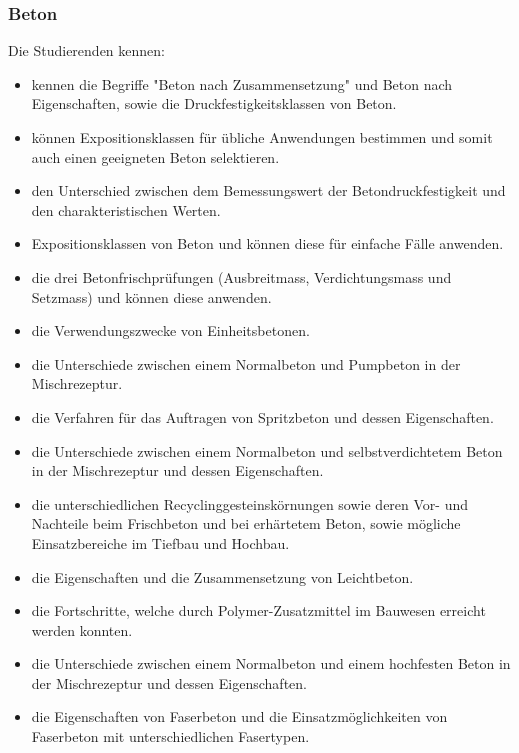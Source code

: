 \subsubsection*{Beton}
Die Studierenden kennen: 

\begin{itemize}[noitemsep]
    \item kennen die Begriffe "Beton nach Zusammensetzung" und Beton nach Eigenschaften, sowie die Druckfestigkeitsklassen von Beton.
    \item können Expositionsklassen für übliche Anwendungen bestimmen und somit auch einen geeigneten Beton selektieren.
  \item den Unterschied zwischen dem Bemessungswert der Betondruckfestigkeit und den charakteristischen Werten.
  \item Expositionsklassen von Beton und können diese für einfache Fälle anwenden.
  \item die drei Betonfrischprüfungen (Ausbreitmass, Verdichtungsmass und Setzmass) und können diese anwenden.
  \item die Verwendungszwecke von Einheitsbetonen.
  \item die Unterschiede zwischen einem Normalbeton und Pumpbeton in der Mischrezeptur.
  \item die Verfahren für das Auftragen von Spritzbeton und dessen Eigenschaften.
  \item die Unterschiede zwischen einem Normalbeton und selbstverdichtetem Beton in der Mischrezeptur und dessen Eigenschaften.
  \item die unterschiedlichen Recyclinggesteinskörnungen sowie deren Vor- und Nachteile beim Frischbeton und bei erhärtetem Beton, sowie mögliche Einsatzbereiche im Tiefbau und Hochbau.
  \item die Eigenschaften und die Zusammensetzung von Leichtbeton.
  \item die Fortschritte, welche durch Polymer-Zusatzmittel im Bauwesen erreicht werden konnten.
  \item die Unterschiede zwischen einem Normalbeton und einem hochfesten Beton in der Mischrezeptur und dessen Eigenschaften.
  \item die Eigenschaften von Faserbeton und die Einsatzmöglichkeiten von Faserbeton mit unterschiedlichen Fasertypen.
\end{itemize}